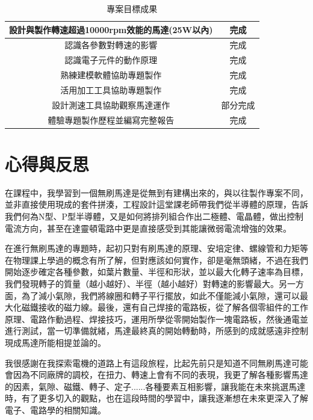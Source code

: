 \documentclass[12pt,a4paper]{article}
\begin{document}
\begin{CJK*}{UTF8}{bkai}
\begin{table}[H]
\begin{tabular}{|c|c|}
            \hline
            設計與製作轉速超過10000rpm效能的馬達(25W以內) & 完成  \\
            \hline
            認識各參數對轉速的影響                   & 完成  \\
            \hline
            認識電子元件的動作原理                   & 完成  \\
            \hline
            熟練建模軟體協助專題製作                  & 完成  \\
            \hline
            活用加工工具協助專題製作                  & 完成  \\
            \hline
            設計測速工具協助觀察馬達運作                & 部分完成 \\
            \hline
            體驗專題製作歷程並編寫完整報告               & 完成  \\
            \hline
        \end{tabular}
        \caption{專案目標成果}
    \end{table}
    \renewcommand{\arraystretch}{1}
    \newpage
    \section{心得與反思}
    在課程中，我學習到一個無刷馬達是從無到有建構出來的，與以往製作專案不同，並非直接使用現成的套件拼湊，工程設計這堂課老師帶我們從半導體的原理，告訴我們何為N型、P型半導體，又是如何將排列組合作出二極體、電晶體，做出控制電流方向，甚至在達靈頓電路中更是直接感受到其能讓微弱電流增強的效果。

    在進行無刷馬達的專題時，起初只對有刷馬達的原理、安培定律、螺線管和力矩等在物理課上學過的概念有所了解，但對應該如何實作，卻是毫無頭緒，不過在我們開始逐步確定各種參數，如葉片數量、半徑和形狀，並以最大化轉子速率為目標，我們發現轉子的質量（越小越好）、半徑（越小越好）對轉速的影響最大。另一方面，為了減小氣隙，我們將線圈和轉子平行擺放，如此不僅能減小氣隙，還可以最大化磁鐵接收的磁力線。最後，還有自己焊接的電路板，從了解各個零組件的工作原理、電路作動過程、焊接技巧，運用所學從零開始製作一塊電路板，然後通電並進行測試，當一切準備就緒，馬達最終真的開始轉動時，所感到的成就感遠非控制現成馬達所能相提並論的。

    我很感謝在我探索電機的道路上有這段旅程，比起先前只是知道不同無刷馬達可能會因為不同廠牌的調校，在扭力、轉速上會有不同的表現，我更了解各種影響馬達的因素，氣隙、磁鐵、轉子、定子......各種要素互相影響，讓我能在未來挑選馬達時，有了更多切入的觀點，也在這段時間的學習中，讓我逐漸想在未來更深入了解電子、電路學的相關知識。


\end{CJK*}
\end{document}
